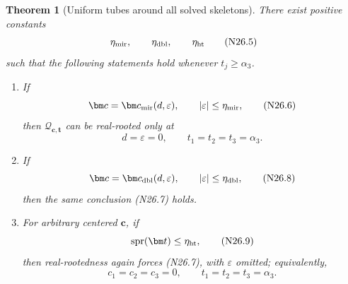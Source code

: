 \documentclass[11pt]{article}
\newtheorem{theorem}{Theorem}[section]
\theoremstyle{definition}
\theoremstyle{remark}
\begin{document}
\begin{theorem}[Uniform tubes around all solved skeletons]
\label{thm:f2v26-tubes}
There exist positive constants
\[
 \eta_{\rm mir},\qquad \eta_{\rm dbl},\qquad \eta_{\rm ht}
 \tag{N26.5}
\]
such that the following statements hold whenever \(t_j\geq\alpha_3\).

\begin{enumerate}[label=\textup{(\roman*)}]
\item If
\[
 \bm c=\bm c_{\rm mir}(d,\varepsilon),
 \qquad |\varepsilon|\leq\eta_{\rm mir},
 \tag{N26.6}
\]
then \(\mathcal Q_{\bm c,\bm t}\) can be real-rooted only at
\[
 d=\varepsilon=0,\qquad
 t_1=t_2=t_3=\alpha_3.
 \tag{N26.7}
\]

\item If
\[
 \bm c=\bm c_{\rm dbl}(d,\varepsilon),
 \qquad |\varepsilon|\leq\eta_{\rm dbl},
 \tag{N26.8}
\]
then the same conclusion \textup{(N26.7)} holds.

\item For arbitrary centered \(\bm c\), if
\[
 \operatorname{spr}(\bm t)\leq\eta_{\rm ht},
 \tag{N26.9}
\]
then real-rootedness again forces \textup{(N26.7)}, with
\(\varepsilon\) omitted; equivalently,
\[
 c_1=c_2=c_3=0,\qquad
 t_1=t_2=t_3=\alpha_3.
 \tag{N26.10}
\]
\end{enumerate}
\end{theorem}
\end{document}
